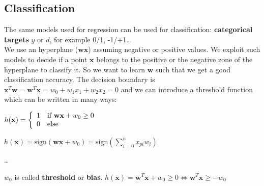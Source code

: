 \documentclass[10pt]{report}
\begin{document}
\subsection{Classification} The same models used for regression can be used for classification: \textbf{categorical targets} $y$ or $d$, for example 0/1, -1/+1\ldots\\
We use an hyperplane ($\mathbf{wx}$) assuming negative or positive values. We exploit such models to decide if a point $\mathbf{x}$ belongs to the positive or the negative zone of the hyperplane to classify it. So we want to learn $\mathbf{w}$ such that we get a good classification accuracy. The decision boundary is $\mathbf{x}^T\mathbf{w} = \mathbf{w}^T\mathbf{x} = w_0 + w_1x_1 + w_2x_2 = 0$ and we can introduce a threshold function which can be written in many ways: \begin{list}{}{}
	\item $h(\mathbf{x}) = \left\{\begin{array}{c l}
	1 & \text{if }\mathbf{wx} + w_0 \geq 0\\
	0 & \text{else}
\end{array}	 \right.$
	\item $h(\mathbf{x}) = \text{sign}(\mathbf{wx} + w_0) = \text{sign}\left(\sum_{i=0}^n x_{pi}w_i\right)$
	\item \ldots
\end{list}
$w_0$ is called \textbf{threshold} or \textbf{bias}. $h(\mathbf{x}) = \mathbf{w}^T\mathbf{x} + w_0 \geq 0 \Leftrightarrow \mathbf{w}^T\mathbf{x} \geq -w_0$
\end{document}
